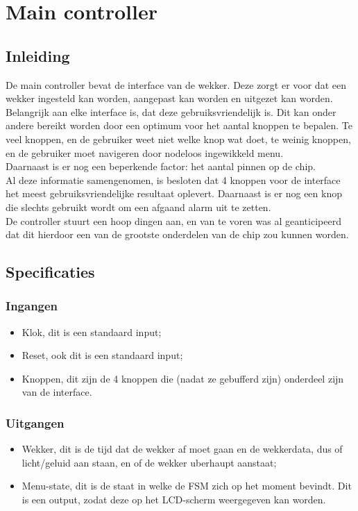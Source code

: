 \chapter{Main controller}
\section{Inleiding}
De main controller bevat de interface van de wekker. Deze zorgt er voor dat een wekker ingesteld kan worden, aangepast kan worden en uitgezet kan worden. Belangrijk aan elke interface is, dat deze gebruiksvriendelijk is. Dit kan onder andere bereikt worden door een optimum voor het aantal knoppen te bepalen. Te veel knoppen, en de gebruiker weet niet welke knop wat doet, te weinig knoppen, en de gebruiker moet navigeren door nodeloos ingewikkeld menu. \\
Daarnaast is er nog een beperkende factor: het aantal pinnen op de chip. \\
Al deze informatie samengenomen, is besloten dat 4 knoppen voor de interface het meest gebruiksvriendelijke resultaat oplevert. Daarnaast is er nog een knop die slechts gebruikt wordt om een afgaand alarm uit te zetten. \\
De controller stuurt een hoop dingen aan, en van te voren was al geanticipeerd dat dit hierdoor een van de grootste onderdelen van de chip zou kunnen worden.

\section{Specificaties}
\subsection{Ingangen}
\begin{itemize}[nolistsep]
\item Klok, dit is een standaard input;
\item Reset, ook dit is een standaard input;
\item Knoppen, dit zijn de 4 knoppen die (nadat ze gebufferd zijn) onderdeel zijn van de interface.
\end{itemize}

\subsection{Uitgangen}
\begin{itemize}[nolistsep]
\item Wekker, dit is de tijd dat de wekker af moet gaan en de wekkerdata, dus of licht/geluid aan staan, en of de wekker uberhaupt aanstaat;
\item Menu-state, dit is de staat in welke de FSM zich op het moment bevindt. Dit is een output, zodat deze op het LCD-scherm weergegeven kan worden.
\end{itemize}

